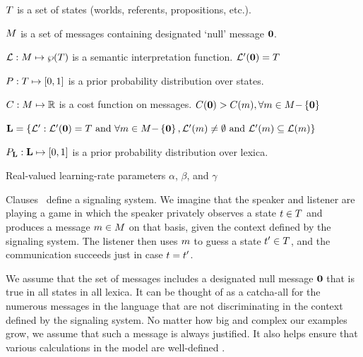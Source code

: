 \documentclass{article}
\begin{document}
\begin{examples}
\item\label{model}
  \begin{examples}
  \item\label{states}%
    $T$ is a set of states (worlds, referents, propositions, etc.).
  \item\label{messages}%
    $M$ is a set of messages containing designated `null' message $\mathbf{0}$.
  \item\label{lex}%
    $\mathcal{L}: M \mapsto \wp(T)$ is a semantic interpretation function. 
    $\mathcal{L}'(\mathbf{0}) = T$
  \item\label{prior}%
    $P : T \mapsto [0,1]$ is a prior probability
    distribution over states.    
  \item\label{costs}%
    $C : M \mapsto \mathbb{R}$ is a cost function on messages.
    $C(\mathbf{0}) > C(m), {\forall m \in M{-}\left\{ \mathbf{0} \right\}}$
  \item\label{lexset}%
      $\mathbf{L} = \left\{ \mathcal{L}' : \mathcal{L}'(\mathbf{0}) = T \text{ and } 
      \forall m \in M{-}\left\{ \mathbf{0} \right\}, 
      \mathcal{L}'(m) \neq \emptyset \text{ and } 
      \mathcal{L}'(m) \subseteq \mathcal{L}(m) \right\}$
  \item\label{LexPrior}%
    $P_{\mathbf{L}} : \mathbf{L} \mapsto [0,1]$ is a prior
    probability distribution over lexica.
  \item\label{temps}%
    Real-valued learning-rate parameters $\alpha$, $\beta$, and
    $\gamma$
  \end{examples}
\end{examples}

Clauses~ define a signaling system. We
imagine that the speaker and listener are playing a game in which the
speaker privately observes a state $t \in T$ and produces a
message $m \in M$ on that basis, given the context defined
by the signaling system. The listener then uses $m$ to guess a
state $t' \in T$, and the communication succeeds just in
case $t = t'$.

We assume that the set of messages includes a designated null message
$\mathbf{0}$ that is true in all states in all lexica. It can be thought
of as a catcha-all for the numerous messages in the language that are
not discriminating in the context defined by the signaling system.  No
matter how big and complex our examples grow, we assume that such a
message is always justified. It also helps ensure that various
calculations in the model are well-defined \citep{Jaeger:2011}.
\end{document}
